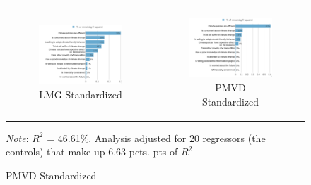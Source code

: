 \documentclass{article}
\begin{document}
\begin{figure}[h!]
\begin{center}
	\begin{tabular}{cc}
		\begin{subfigure}{0.5\textwidth}
		\caption{LMG Standardized}
			\includegraphics[width=\textwidth]{lmg_investments_standardized}
		\end{subfigure}&
		\begin{subfigure}{0.5\textwidth}
		\caption{PMVD Standardized}
			\includegraphics[width=\textwidth]{pmvd_investments_standardized}
		\end{subfigure}\\
	\end{tabular}
	{\footnotesize \textit{Note}:  $R^2$ = 46.61\%. Analysis adjusted for 20 regressors (the controls) that make up 6.63 pcts. pts of $R^2$}
\end{center}
\end{figure}
\end{document}
